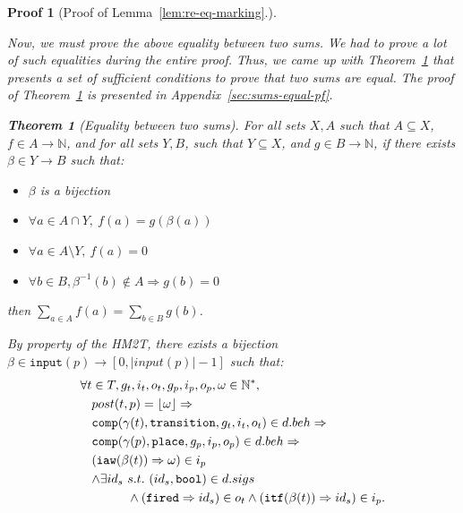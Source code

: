 \documentclass[pdflatex,sn-mathphys]{sn-jnl}%
\theoremstyle{thmstyleone}%
\newtheorem{theorem}{Theorem}%
\theoremstyle{thmstyletwo}%
\newtheorem*{pf}{Proof}%
\theoremstyle{thmstylethree}%
\begin{document}
\begin{pf}[Proof of Lemma~\ref{lem:re-eq-marking}.]
\begin{itemize}
    Now, we must prove the above equality between two sums. We had to
    prove a lot of such equalities during the entire proof. Thus, we
    came up with Theorem~\ref{thm:sums-equal} that presents a set of
    sufficient conditions to prove that two sums are equal. The proof
    of Theorem~\ref{thm:sums-equal} is presented in
    Appendix~\ref{sec:sums-equal-pf}.

    \begin{theorem}[Equality between two sums]
      \label{thm:sums-equal}
      For all sets $X,A$ such that $A\subseteq{}X$,
      $f\in{}A\rightarrow\mathbb{N}$, and for all sets $Y, B$, such
      that $Y\subseteq{}X$, and $g\in{}B\rightarrow\mathbb{N}$, if
      there exists $\beta\in{}Y\rightarrow{}B$ such that:
      \begin{itemize}
      \item $\beta$ is a bijection
      \item $\forall{}a\in{}A\cap{}Y,~f(a)=g(\beta(a))$
      \item $\forall{}a\in{}A\setminus{}Y,~f(a)=0$
      \item $\forall{}b\in{}B,\beta^{-1}(b)\notin{}A\Rightarrow{}g(b)=0$
      \end{itemize}
      then $\sum\limits_{a\in{}A}f(a)=\sum\limits_{b\in{}B}g(b)$.
    \end{theorem}
        
    By property of the HM2T, there exists a bijection
    $\beta\in\mathtt{input}(p)\rightarrow{}[0,\vert{}input(p)\vert-1]$
    such that:
    \begin{equation}
      \label{eq:bij-input}
      \begin{aligned}[t]
        \forall{}t&\in{}T,g_t,i_t,o_t,g_p,i_p,o_p,\omega\in\mathbb{N}^{*}, \\
                  & post(t,p)=\lfloor\omega\rfloor\Rightarrow \\
                  & \mathtt{comp}(\gamma(t),\mathtt{transition},g_t,i_t,o_t)\in{}d.beh\Rightarrow \\
                  & \mathtt{comp}(\gamma(p),\mathtt{place},g_p,i_p,o_p)\in{}d.beh\Rightarrow\\
                  &
                    \begin{aligned}[t]
                      & (\mathtt{iaw}(\beta(t))\Rightarrow\omega)\in{}i_p \\
                      & \begin{aligned}[t]
                          \land\exists{}id_s~&s.t.~(id_s,\mathtt{bool})\in{}d.sigs \\
                                             & \land(\mathtt{fired}\Rightarrow{}id_s)\in{}o_t\land(\mathtt{itf}(\beta(t))\Rightarrow{}id_s)\in{}i_p.\\
                        \end{aligned} \\
                    \end{aligned}
        \\
      \end{aligned}
    \end{equation}


\end{itemize}
\end{pf}
\end{document}
